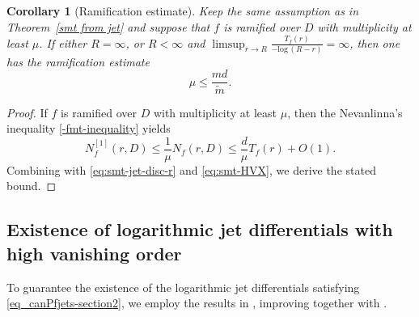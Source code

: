 \documentclass[english, 12pt]{amsart}
\def\log{\mathrm{log}\,}
\theoremstyle{plain}
\newtheorem{cor}[thm]{{Corollary}}
\theoremstyle{remark}
\numberwithin{equation}{section}
\theoremstyle{plain}
\theoremstyle{named}
\begin{document}
\begin{cor}[Ramification estimate]
	\label{ramification}
	Keep the same assumption as in Theorem~\ref{smt from jet} and suppose that $f$ is ramified over $D$ with multiplicity at least $\mu$. If either $R=\infty$, or $R<\infty$ and $\limsup_{r\rightarrow R}\frac{T_f(r)}{-\log (R-r)}=\infty$, then one has the ramification estimate
	\[
	\mu\leq \dfrac{md}{\widetilde{m}}.
	\]
\end{cor}
\begin{proof}
	If $f$ is ramified over $D$ with multiplicity at least $\mu$, then the Nevanlinna's inequality \eqref{-fmt-inequality} yields
	\[N^{[1]}_f(r,D)\leq \frac{1}{\mu} N_f(r,D)\leq \frac{d}{\mu}T_f(r)+O(1).\]
	Combining with \eqref{eq:smt-jet-disc-r} and \eqref{eq:smt-HVX}, we derive the stated bound.
\end{proof}

\subsection{Existence of logarithmic jet differentials with high vanishing order}
To guarantee the existence of the logarithmic jet differentials satisfying \eqref{eq_canPfjets-section2}, we employ the results in \cite{Merker-Ta22}, improving \cite{Darondeau2016} together with \cite{Riedl-Yang22}.
\end{document}
